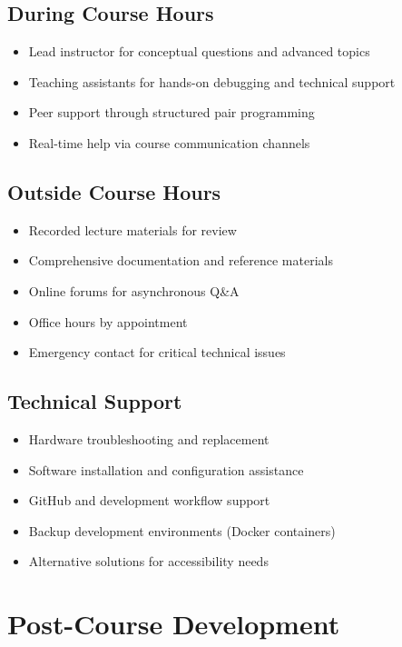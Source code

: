 \documentclass[11pt,a4paper]{article}
\begin{document}
\subsection{During Course Hours}
\begin{itemize}
    \item Lead instructor for conceptual questions and advanced topics
    \item Teaching assistants for hands-on debugging and technical support
    \item Peer support through structured pair programming
    \item Real-time help via course communication channels
\end{itemize}

\subsection{Outside Course Hours}
\begin{itemize}
    \item Recorded lecture materials for review
    \item Comprehensive documentation and reference materials
    \item Online forums for asynchronous Q\&A
    \item Office hours by appointment
    \item Emergency contact for critical technical issues
\end{itemize}

\subsection{Technical Support}
\begin{itemize}
    \item Hardware troubleshooting and replacement
    \item Software installation and configuration assistance
    \item GitHub and development workflow support
    \item Backup development environments (Docker containers)
    \item Alternative solutions for accessibility needs
\end{itemize}

\section{Post-Course Development}
\end{document}
